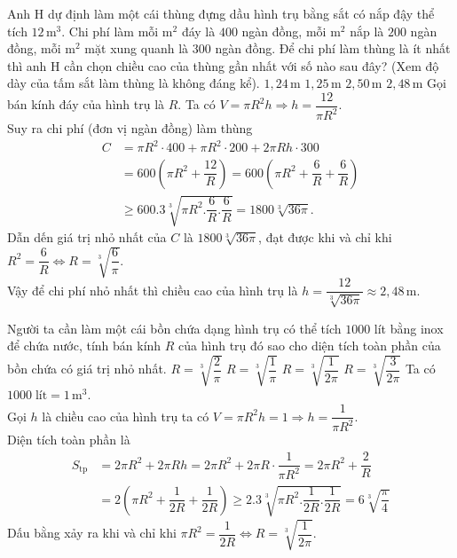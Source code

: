 \begin{ex}%
	Anh H dự định làm một cái thùng đựng dầu hình trụ bằng sắt có nắp đậy thể tích $12\,\mathrm{m}^3$. Chi phí làm mỗi $\mathrm{m}^2$ đáy là $400$ ngàn đồng, mỗi $\mathrm{m}^2$ nắp là $200$ ngàn đồng, mỗi $\mathrm{m}^2$ mặt xung quanh là $300$ ngàn đồng. Để chi phí làm thùng là ít nhất thì anh H cần chọn chiều cao của thùng gần nhất với số nào sau đây? (Xem độ dày của tấm sắt làm thùng là không đáng kể).
	\choice
	{$1{,}24\,\mathrm{m}$}
	{$1{,}25\,\mathrm{m}$}
	{$2{,}50\,\mathrm{m}$}
	{\True $2{,}48\,\mathrm{m}$}
	\loigiai
	{Gọi bán kính đáy của hình trụ là $R$. Ta có $V=\pi{R^2}h\Rightarrow h=\dfrac{12}{\pi{R^2}}$.\\
		Suy ra chi phí (đơn vị ngàn đồng) làm thùng\\
		\begin{align*}
			C&=\pi{R^2}\cdot 400+\pi{R^2}\cdot 200+2\pi Rh\cdot 300\\
			&=600\left(\pi{R^2}+\dfrac{12}{R}\right)=600\left(\pi{R^2}+\dfrac{6}{R}+\dfrac{6}{R}\right)\\
			&\ge 600.3\sqrt[3]{\pi{R^2}.\dfrac{6}{R}.\dfrac{6}{R}}=1800\sqrt[3]{36\pi}.
		\end{align*}
		Dẫn dến giá trị nhỏ nhất của $C$ là $1800\sqrt[3]{36\pi}$, đạt được khi và chỉ khi ${R^2}=\dfrac{6}{R}\Leftrightarrow R=\sqrt[3]{\dfrac{6}{\pi}}$.\\
		Vậy để chi phí nhỏ nhất thì chiều cao của hình trụ là $h=\dfrac{12}{\sqrt[3]{36\pi}}\approx 2{,}48\,\mathrm{m}$.}
\end{ex}

\begin{ex}%
	Người ta cần làm một cái bồn chứa dạng hình trụ có thể tích $1000$ lít bằng inox để chứa nước, tính bán kính $R$ của hình trụ đó sao cho diện tích toàn phần của bồn chứa có giá trị nhỏ nhất.
	\choice
	{$R=\sqrt[3]{\dfrac{2}{\pi}}$}
	{$R=\sqrt[3]{\dfrac{1}{\pi}}$}
	{\True $R=\sqrt[3]{\dfrac{1}{2\pi}}$}
	{$R=\sqrt[3]{\dfrac{3}{2\pi}}$}
	\loigiai
	{Ta có $1000\; \text{lít} = 1\, \mathrm{m}^3$.\\
		Gọi $h$ là chiều cao của hình trụ ta có $V=\pi{R^2}h=1\Rightarrow h=\dfrac{1}{\pi{R^2}}$.\\
		Diện tích toàn phần là 
		\begin{align*}
			S_{\mathrm{tp}}&=2\pi{R^2}+2\pi Rh=2\pi{R^2}+2\pi R\cdot \dfrac{1}{\pi{R^2}}=2\pi{R^2}+\dfrac{2}{R}\\
			&=2\left(\pi{R^2}+\dfrac{1}{2R}+\dfrac{1}{2R}\right)\ge 2.3\sqrt[3]{\pi{R^2}.\dfrac{1}{2R}.\dfrac{1}{2R}}=6\sqrt[3]{\dfrac{\pi}{4}}
		\end{align*}
		Dấu bằng xảy ra khi và chỉ khi $\pi{R^2}=\dfrac{1}{2R}\Leftrightarrow R=\sqrt[3]{\dfrac{1}{2\pi}}$.}
\end{ex}

